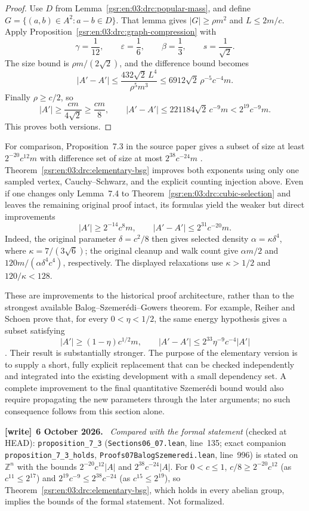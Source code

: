\documentclass[11pt,letterpaper]{article}
\numberwithin{equation}{section}
\theoremstyle{definition}
\theoremstyle{remark}
\newcommand{\Z}{\mathbb Z}
\newcommand{\1}{\mathbf 1}
\newcommand{\abs}[1]{\left|#1\right|}
\newcommand{\file}[1]{\nolinkurl{#1}}
\newenvironment{writenote}[1][]{\par\smallskip\begingroup\small
 \noindent\textbf{[write]}\if\relax\detokenize{#1}\relax\else~\textbf{#1.}\fi\ }%
 {\par\endgroup\smallskip}
\begin{document}
\begin{proof}
Use $D$ from Lemma~\ref{gsr:en:03:drc:popular-mass}, and define
$G=\{(a,b)\in A^2:a-b\in D\}$.  That lemma gives
$\abs G\geq\rho m^2$ and $L\leq2m/c$.  Apply
Proposition~\ref{gsr:en:03:drc:graph-compression} with
\[
 \gamma=\frac1{12},\qquad \varepsilon=\frac16,\qquad
 \beta=\frac13,\qquad s=\frac1{\sqrt2}.
\]
The size bound is $\rho m/(2\sqrt2)$, and the difference bound becomes
\[
 \abs{A'-A'}
 \leq\frac{432\sqrt2\,L^4}{\rho^5m^3}
 \leq6912\sqrt2\,\rho^{-5}c^{-4}m.
\]
Finally $\rho\geq c/2$, so
\[
 \abs{A'}\geq\frac{cm}{4\sqrt2}\geq\frac{cm}{8},
 \qquad
 \abs{A'-A'}\leq221184\sqrt2\,c^{-9}m
 <2^{19}c^{-9}m.
\]
This proves both versions.
\end{proof}

For comparison, Proposition~7.3 in the source paper gives a subset of
size at least $2^{-20}c^{12}m$ with difference set of size at most
$2^{38}c^{-24}m$ \cite{gowers}.  Theorem~\ref{gsr:en:03:drc:elementary-bsg}
improves both exponents using only one sampled vertex, Cauchy--Schwarz,
and the explicit counting injection above.  Even if one changes only
Lemma~7.4 to Theorem~\ref{gsr:en:03:drc:cubic-selection} and leaves the remaining
original proof intact, its formulas yield the weaker but direct
improvements
\[
 \abs{A'}\geq2^{-14}c^8m,
 \qquad \abs{A'-A'}\leq2^{31}c^{-20}m.
\]
Indeed, the original parameter $\delta=c^2/8$ then gives selected density
$\alpha=\kappa\delta^4$, where $\kappa=7/(3\sqrt6)$; the original cleanup
and walk count give $\alpha m/2$ and
$120m/(\alpha\delta^4c^4)$, respectively.  The displayed relaxations use
$\kappa>1/2$ and $120/\kappa<128$.

These are improvements to the historical proof architecture, rather
than to the strongest available Balog--Szemer\'edi--Gowers theorem.
For example, Reiher and Schoen prove that, for every $0<\eta<1/2$, the
same energy hypothesis gives a subset satisfying
\[
 \abs{A'}\geq(1-\eta)c^{1/2}m,
 \qquad
 \abs{A'-A'}\leq2^{33}\eta^{-9}c^{-4}\abs{A'}
\]
\cite[Theorem~1.2]{reiherschoen}.  Their result is substantially
stronger.  The purpose of the elementary version is to supply a short,
fully explicit replacement that can be checked independently and
integrated into the existing development with a small dependency set.
A complete improvement to the final quantitative Szemer\'edi bound would
also require propagating the new parameters through the later
arguments; no such consequence follows from this section alone.
\begin{writenote}[6 October 2026]
\emph{Compared with the formal statement} (checked at HEAD): \file{proposition_7_3} (\file{Sections06\_07.lean}, line~135; exact companion \file{proposition_7_3_holds}, \file{Proofs07BalogSzemeredi.lean}, line~996) is stated on $\Z^n$ with the bounds $2^{-20}c^{12}|A|$ and $2^{38}c^{-24}|A|$. For $0<c\le1$, $c/8\ge2^{-20}c^{12}$ (as $c^{11}\le2^{17}$) and $2^{19}c^{-9}\le2^{38}c^{-24}$ (as $c^{15}\le2^{19}$), so Theorem~\ref{gsr:en:03:drc:elementary-bsg}, which holds in every abelian group, implies the bounds of the formal statement. Not formalized.
\end{writenote}
\end{document}
